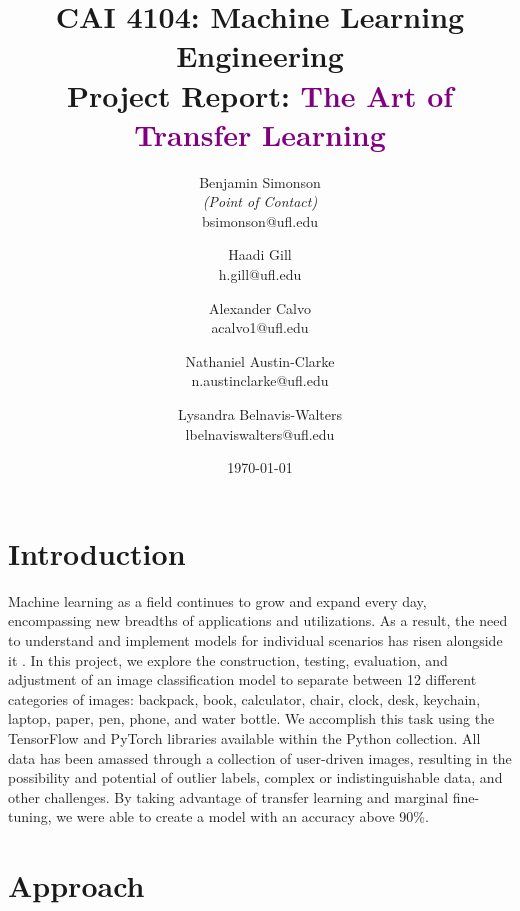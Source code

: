 \documentclass[10pt]{article}
\title{CAI 4104: Machine Learning Engineering\\
	\large Project Report:  {\textcolor{purple}{The Art of Transfer Learning}}} %
\author{
        Benjamin Simonson \\{\em (Point of Contact)} \\
        bsimonson@ufl.edu\\
        \and
        Haadi Gill\\
        h.gill@ufl.edu\\
        \and
        Alexander Calvo \\
        acalvo1@ufl.edu\\
        \and
        Nathaniel Austin-Clarke \\
        n.austinclarke@ufl.edu\\
        \and
        Lysandra Belnavis-Walters \\
        lbelnaviswalters@ufl.edu\\
}
\date{\today}
\begin{document}

\maketitle






\section{Introduction}

\indent Machine learning as a field continues to grow and expand every day, encompassing new breadths of applications and utilizations. As a result, the need to understand and implement models for individual scenarios has risen alongside it \cite{sarker2021}. In this project, we explore the construction, testing, evaluation, and adjustment of an image classification model to separate between 12 different categories of images: backpack, book, calculator, chair, clock, desk, keychain, laptop, paper, pen, phone, and water bottle. We accomplish this task using the TensorFlow \cite{tensorflow} and PyTorch \cite{pytorch} libraries available within the Python collection. All data has been amassed through a collection of user-driven images, resulting in the possibility and potential of outlier labels, complex or indistinguishable data, and other challenges. By taking advantage of transfer learning and marginal fine-tuning, we were able to create a model with an accuracy above 90\%.




\section{Approach}
\end{document}
